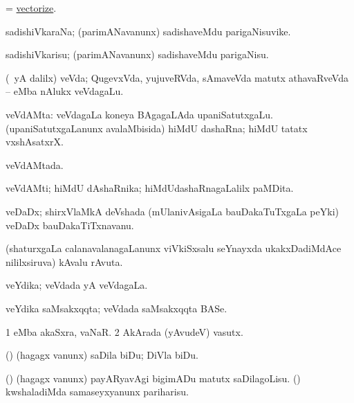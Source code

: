 \bentry
{} 
\gl{\sakirx}
\expl{}
\bmng
 = \hyperlink{vectorize}{vectorize}. 
\emng
\eentry

\bentry
{} 
\gl{\nA}
\expl{}
\bmng
 sadishiVkaraNa; (parimANavanunx) sadishaveMdu parigaNisuvike. 
\emng
\eentry

\bentry
{} 
\gl{\sakirx}
\expl{}
\bmng
 sadishiVkarisu; (parimANavanunx) sadishaveMdu parigaNisu. 
\emng
\eentry

\bentry
{} 
\gl{\nA}
\expl{}
\bmng
 (\Eva\ yA \bava dalilx) veVda; QugevxVda, yujuveRVda, sAmaveVda matutx athavaRveVda -- eMba nAlukx veVdagaLu. 
\emng
\eentry

\bentry
{} 
\gl{\nA}
\expl{}
\bmng
 veVdAMta: 
\banum
{} veVdagaLa koneya BAgagaLAda upaniSatutxgaLu. 
 (upaniSatutxgaLanunx avalaMbisida) hiMdU dashaRna; hiMdU tatatx vxshAsatxrX. 
\eanum
\emng
\eentry

\bentry
{} 
\gl{\gu}
\expl{}
\bmng
 veVdAMtada. 
\emng
\eentry

\bentry
{} 
\gl{\nA}
\expl{}
\bmng
 veVdAMti; hiMdU dAshaRnika; hiMdUdashaRnagaLalilx paMDita. 
\emng
\eentry

\bentry
{} 
\gl{\nA}
\expl{}
\bmng
 veDaDx; shirxVlaMkA deVshada (mUlanivAsigaLa bauDakaTuTxgaLa peYki) veDaDx bauDakaTiTxnavanu. 
\emng
\eentry

\bentry
{} 
\gl{\nA}
\expl{}
\bmng
 (shaturxgaLa calanavalanagaLanunx viVkiSxsalu seYnayxda ukakxDadiMdAce nililxsiruva) kAvalu rAvuta. 
\emng
\eentry

\bentry
{} 
\gl{\gu}
\expl{}
\bmng
 veYdika; veVdada yA veVdagaLa. 
\emng
\eentry

\bentry
{} 
\gl{\nA}
\expl{}
\bmng
 veYdika saMsakxqqta; veVdada saMsakxqqta BASe. 
\emng
\eentry

\bentry
{} 
\gl{\nA}
\expl{}
\bmng
\bnum
\num{1}  eMba akaSxra, vaNaR. 
\num{2} AkArada (yAvudeV) vasutx. 
\enum
\emng
\eentry

\bentry
{} 
\gl{\sakirx}
\expl{}
\bmng
(\nw) (hagagx \mo vanunx) saDila biDu; DiVla biDu. 
\emng

\noindent
\gl{\pagu}
\expl{}
\bmng
\banum
{} (\nw) (hagagx \mo vanunx) payARyavAgi bigimADu matutx saDilagoLisu. 
 (\rUpa) kwshaladiMda samaseyxyanunx pariharisu. 
\eanum
\emng
\eentry

